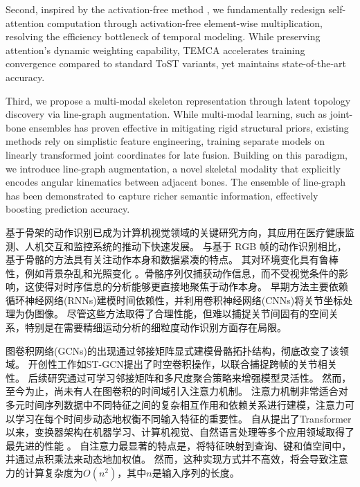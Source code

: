 Second, inspired by the activation-free method \cite{rewrite_stars}, we fundamentally redesign self-attention computation through 
activation-free element-wise multiplication, resolving the efficiency 
bottleneck of temporal modeling. 
While preserving attention's dynamic weighting capability, TEMCA 
accelerates training convergence compared to standard 
ToST variants, yet maintains state-of-the-art accuracy. 


Third, we propose a multi-modal skeleton representation through latent 
topology discovery via line-graph augmentation. While multi-modal 
learning, such as joint-bone ensembles \cite{ref9,ref10,ref11,ref13} has proven 
effective in mitigating rigid structural priors, existing methods rely 
on simplistic feature engineering, training separate models on linearly 
transformed joint coordinates for late fusion. 
Building on this paradigm, we introduce line-graph augmentation, a 
novel skeletal modality that explicitly encodes angular kinematics 
between adjacent bones. The ensemble of line-graph has been demonstrated 
to capture richer semantic information, effectively boosting prediction 
accuracy.

基于骨架的动作识别已成为计算机视觉领域的关键研究方向，其应用在医疗健康监测\cite{ref1}、人机交互\cite{ref2}和监控系统\cite{ref3}的推动下快速发展。
与基于 RGB 帧的动作识别相比，基于骨骼的方法具有关注动作本身和数据紧凑的特点\cite{skeleton-useful}。
其对环境变化具有鲁棒性，例如背景杂乱和光照变化 。骨骼序列仅捕获动作信息，而不受视觉条件的影响，这使得对时序信息的分析能够更直接地聚焦于动作本身。
早期方法主要依赖循环神经网络(RNNs)\cite{ref4,ref5}建模时间依赖性，并利用卷积神经网络(CNNs)\cite{ref6}将关节坐标处理为伪图像。
尽管这些方法取得了合理性能，但难以捕捉关节间固有的空间关系，特别是在需要精细运动分析的细粒度动作识别方面存在局限\cite{ref7}。

图卷积网络(GCNs)\cite{ref8}的出现通过邻接矩阵显式建模骨骼拓扑结构，彻底改变了该领域。
开创性工作如ST-GCN\cite{ref7}提出了时空卷积操作，以联合捕捉跨帧的关节相关性。
后续研究通过可学习邻接矩阵\cite{ref9,ref10}和多尺度聚合策略\cite{multiscale}来增强模型灵活性。
然而，至今为止，尚未有人在图卷积的时间域引入注意力机制。
注意力机制非常适合对多元时间序列数据中不同特征之间的复杂相互作用和依赖关系进行建模，注意力可以学习在每个时间步动态地权衡不同输入特征的重要性\cite{temporal-attention-useful}。
自从\cite{attention-is-all-you-need}提出了Transformer以来，变换器架构在机器学习、计算机视觉、自然语言处理等多个应用领域取得了最先进的性能
\cite{bert} \cite{radford2019language} \cite{brown2020language} \cite{chen2020generative} \cite{dosovitskiy2020image}。
自注意力最显著的特点是，将特征映射到查询、键和值空间中，并通过点积乘法来动态地加权值。
然而，这种实现方式并不高效，将会导致注意力的计算复杂度为$O(n^2)$，其中$n$是输入序列的长度。


